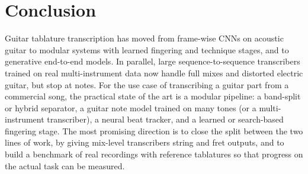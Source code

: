 \section{Conclusion}
\label{sec:conclusion}

Guitar tablature transcription has moved from frame-wise CNNs on acoustic
guitar to modular systems with learned fingering and technique stages, and to
generative end-to-end models. In parallel, large sequence-to-sequence
transcribers trained on real multi-instrument data now handle full mixes and
distorted electric guitar, but stop at notes. For the use case of
transcribing a guitar part from a commercial song, the practical state of the
art is a modular pipeline: a band-split or hybrid separator, a guitar note
model trained on many tones (or a multi-instrument transcriber), a neural beat
tracker, and a learned or search-based fingering stage. The most promising
direction is to close the split between the two lines of work, by giving
mix-level transcribers string and fret outputs, and to build a benchmark of
real recordings with reference tablatures so that progress on the actual task
can be measured.
